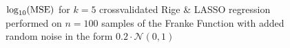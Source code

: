 \documentclass[reprint, english, nofootinbib]{revtex4-2}
\begin{document}
    \begin{figure}
         \centering
         \caption{$\log_{10}(\textup{MSE})$ for $k=5$ crossvalidated Rige \& LASSO regression performed on $n=100$ samples of the Franke Function with added random noise in the form $0.2 \cdot \mathcal N(0, 1)$}
         \label{contour plots}
    \end{figure}
\end{document}
